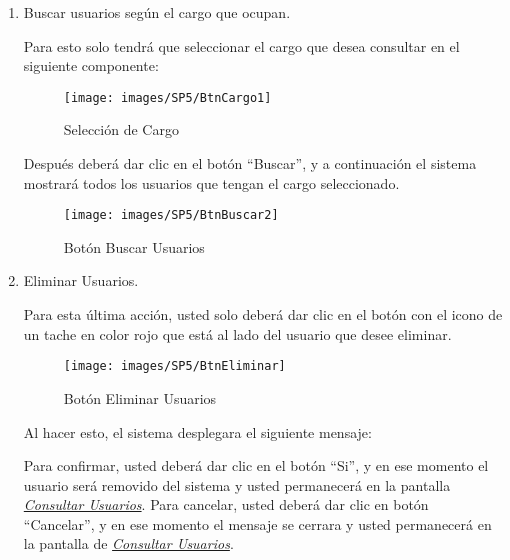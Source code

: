         \begin{enumerate}
        
            \item   Buscar usuarios según el cargo que ocupan.
        
                Para esto solo tendrá que seleccionar el cargo que desea consultar en el siguiente componente:
            
                \begin{figure}[!hbtp]
                    \centering
                    \hypertarget{cargo1}{\texttt{[image: images/SP5/BtnCargo1]}}
                    \caption{Selección de Cargo}
                    \label{cargo1}
                \end{figure}
            
                Después deberá dar clic en el botón “Buscar”, y a continuación el sistema mostrará todos los usuarios que tengan el cargo seleccionado.
                
                \begin{figure}[!hbtp]
                    \centering
                    \hypertarget{buscar}{\texttt{[image: images/SP5/BtnBuscar2]}}
                    \caption{Botón Buscar Usuarios}
                    \label{buscar}
                \end{figure}
                
            \item Eliminar Usuarios.
            
                Para esta última acción, usted solo deberá dar clic en el botón con el icono de un tache en color rojo que está al lado del usuario que desee  eliminar. 
            
                \begin{figure}[!hbtp]
                    \centering
                    \hypertarget{eliminar}{\texttt{[image: images/SP5/BtnEliminar]}}
                    \caption{Botón Eliminar Usuarios}
                    \label{eliminar}
                \end{figure}
            
                Al hacer esto, el sistema desplegara el siguiente mensaje:
                
            
                Para confirmar, usted deberá dar clic en el botón “Si”, y en ese momento el usuario será removido del sistema y usted permanecerá en la pantalla \hyperlink{consultarUs}{\textit{Consultar Usuarios}}.
                Para cancelar, usted deberá dar clic en botón “Cancelar”, y en ese momento el mensaje se cerrara y usted permanecerá en la pantalla de \hyperlink{consultarUs}{\textit{Consultar Usuarios}}.\\
        
        \end{enumerate}

